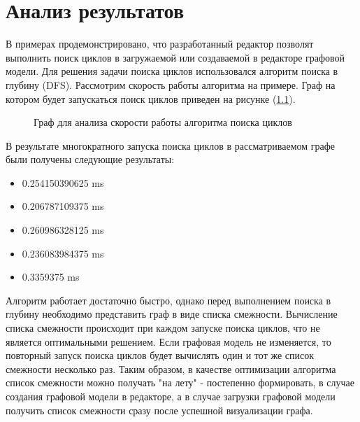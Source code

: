 \chapter{Анализ результатов}\label{chap6_results_analysis}

В примерах продемонстрировано, что разработанный редактор позволят выполнить поиск циклов в загружаемой или создаваемой в редакторе графовой модели. Для решения задачи поиска циклов использовался алгоритм поиска в глубину (DFS). Рассмотрим скорость работы алгоритма на примере. Граф на котором будет запускаться поиск циклов приведен на рисунке (\ref{fig:example_time_check}).

\begin{figure}[ht!]
\caption{Граф для анализа скорости работы алгоритма поиска циклов}
\label{fig:example_time_check}
\end{figure} 

В результате многократного запуска поиска циклов в рассматриваемом графе были получены следующие результаты:
\begin{itemize}
\item 0.254150390625 ms
\item 0.206787109375 ms
\item 0.260986328125 ms
\item 0.236083984375 ms
\item 0.3359375 ms
\end{itemize}

Алгоритм работает достаточно быстро, однако перед выполнением поиска в глубину необходимо представить граф в виде списка смежности. Вычисление списка смежности происходит при каждом запуске поиска циклов, что не является оптимальными решением. Если графовая модель не изменяется, то повторный запуск поиска циклов будет вычислять один и тот же список смежности несколько раз. Таким образом, в качестве оптимизации алгоритма список смежности можно получать "на лету" - постепенно формировать, в случае создания графовой модели в редакторе, а в случае загрузки графовой модели получить список смежности сразу после успешной визуализации графа.